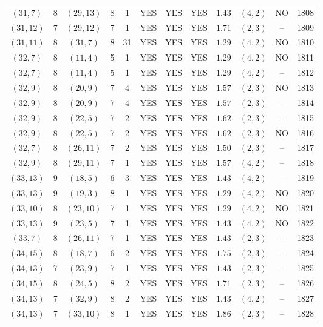\begin{longtable}{|c|c|c|c|c|c|c|c|c|c|c|c|}
$(31,7)$ & 8 & $(29,13)$ & 8 & 1 & YES & YES & YES & $1.43$ & $(4,2)$ & NO & 1808\\
$(31,12)$ & 7 & $(29,12)$ & 7 & 1 & YES & YES & YES & $1.71$ & $(2,3)$ & -- & 1809\\
$(31,11)$ & 8 & $(31,7)$ & 8 & 31 & YES & YES & YES & $1.29$ & $(4,2)$ & NO & 1810\\
$(32,7)$ & 8 & $(11,4)$ & 5 & 1 & YES & YES & YES & $1.29$ & $(4,2)$ & NO & 1811\\
$(32,7)$ & 8 & $(11,4)$ & 5 & 1 & YES & YES & YES & $1.29$ & $(4,2)$ & -- & 1812\\
$(32,9)$ & 8 & $(20,9)$ & 7 & 4 & YES & YES & YES & $1.57$ & $(2,3)$ & NO & 1813\\
$(32,9)$ & 8 & $(20,9)$ & 7 & 4 & YES & YES & YES & $1.57$ & $(2,3)$ & -- & 1814\\
$(32,9)$ & 8 & $(22,5)$ & 7 & 2 & YES & YES & YES & $1.62$ & $(2,3)$ & -- & 1815\\
$(32,9)$ & 8 & $(22,5)$ & 7 & 2 & YES & YES & YES & $1.62$ & $(2,3)$ & NO & 1816\\
$(32,7)$ & 8 & $(26,11)$ & 7 & 2 & YES & YES & YES & $1.50$ & $(2,3)$ & -- & 1817\\
$(32,9)$ & 8 & $(29,11)$ & 7 & 1 & YES & YES & YES & $1.57$ & $(4,2)$ & -- & 1818\\
$(33,13)$ & 9 & $(18,5)$ & 6 & 3 & YES & YES & YES & $1.43$ & $(4,2)$ & -- & 1819\\
$(33,13)$ & 9 & $(19,3)$ & 8 & 1 & YES & YES & YES & $1.29$ & $(4,2)$ & NO & 1820\\
$(33,10)$ & 8 & $(23,10)$ & 7 & 1 & YES & YES & YES & $1.29$ & $(4,2)$ & NO & 1821\\
$(33,13)$ & 9 & $(23,5)$ & 7 & 1 & YES & YES & YES & $1.43$ & $(4,2)$ & NO & 1822\\
$(33,7)$ & 8 & $(26,11)$ & 7 & 1 & YES & YES & YES & $1.43$ & $(2,3)$ & -- & 1823\\
$(34,15)$ & 8 & $(18,7)$ & 6 & 2 & YES & YES & YES & $1.75$ & $(2,3)$ & -- & 1824\\
$(34,13)$ & 7 & $(23,9)$ & 7 & 1 & YES & YES & YES & $1.43$ & $(2,3)$ & -- & 1825\\
$(34,15)$ & 8 & $(24,5)$ & 8 & 2 & YES & YES & YES & $1.71$ & $(2,3)$ & -- & 1826\\
$(34,13)$ & 7 & $(32,9)$ & 8 & 2 & YES & YES & YES & $1.43$ & $(4,2)$ & -- & 1827\\
$(34,13)$ & 7 & $(33,10)$ & 8 & 1 & YES & YES & YES & $1.86$ & $(2,3)$ & -- & 1828\\

\end{longtable}
